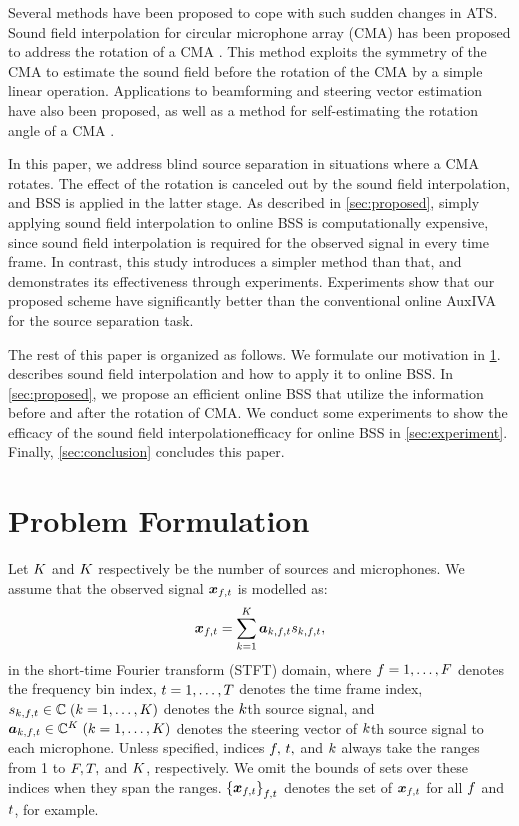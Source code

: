 \documentclass[sip,biber]{now-journal}
\begin{document}
Several methods have been proposed to cope with such sudden changes in ATS.
Sound field interpolation for circular microphone array (CMA) has been proposed to address the rotation of a CMA \cite{Wakabayashi:2023:ASLP}.
This method exploits the symmetry of the CMA to estimate the sound field before the rotation of the CMA by a simple linear operation.
Applications to beamforming \cite{Wakabayashi:2021:ICASSP} and steering vector estimation \cite{Wakabayashi:2021:ASJ:A} have also been proposed,
as well as a method for self-estimating the rotation angle of a CMA \cite{Lian:2021:APSIPA}.

In this paper, we address blind source separation in situations where a CMA rotates.
The effect of the rotation is canceled out by the sound field interpolation, and BSS is applied in the latter stage.
As described in \cref{sec:proposed}, simply applying sound field interpolation to online BSS is computationally expensive, since sound field interpolation is required for the observed signal in every time frame.
In contrast, this study introduces a simpler method than that, and demonstrates its effectiveness through experiments.
Experiments show that our proposed scheme have significantly better than the conventional online AuxIVA for the source separation task.

The rest of this paper is organized as follows.
We formulate our motivation in \cref{sec:problem}.
 describes sound field interpolation and how to apply it to online BSS.
In \cref{sec:proposed}, we propose an efficient online BSS that utilize the information before and after the rotation of CMA.
We conduct some experiments to show the efficacy of the sound field interpolationefficacy  for online BSS in \cref{sec:experiment}.
Finally, \cref{sec:conclusion} concludes this paper.

\section{Problem Formulation}\label{sec:problem}
Let $K$ and $K$ respectively be the number of sources and microphones.
We assume that the observed signal $\Obs _{\ft}$ is modelled as:
\begin{equation}
  \Obs _{\ft} = \sum _{\src=1} ^{\Src} \steer _{\src,\ft} \sig _{\src,\ft},
\end{equation}
in the short-time Fourier transform (STFT) domain,
where $f = 1, \dots, F$ denotes the frequency bin index,
$t = 1, \dots, T$ denotes the time frame index,
$\sig _{\src,\ft} \in \C\; (\src = 1, \dots, \Src)$ denotes the $k$th source signal, and
$\steer _{\src,\ft} \in \C ^{\Mic}\; (\src = 1, \dots, \Mic)$ denotes the steering vector of $k$th source signal to each microphone.
Unless specified, indices $f,\, t,$ and $k$ always take the ranges from 1 to $F, T,$ and $K$, respectively.
We omit the bounds of sets over these indices when they span the ranges.
${\{\Obs _{\ft}\}}_{\ft}$ denotes the set of $\Obs _{\ft}$ for all $f$ and $t$, for example.
\end{document}
